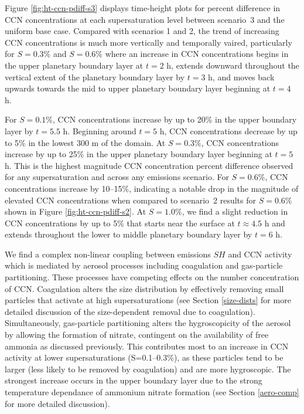 Figure \ref{fig:ht-ccn-pdiff-s3} displays time-height plots for percent difference in CCN concentrations at each supersaturation level between scenario~3 and the uniform base case. 
Compared with scenarios 1 and 2, the trend of increasing CCN concentrations is much more vertically and temporally vaired, particularly for $S=0.3\%$ and $S=0.6\%$ where an increase in CCN concentrations begins in the upper planetary boundary layer at $t=2$ h, extends downward throughout the vertical extent of the planetary boundary layer by $t=3$ h, and moves back upwards towards the mid to upper planetary boundary layer beginning at $t=4$ h. 

For $S=0.1\%$, CCN concentrations increase by up to 20\% in the upper boundary layer by $t=5.5$ h. Beginning around $t=5$ h, CCN concentrations decrease by up to 5\% in the lowest 300 m of the domain. At $S=0.3\%$, CCN concentrations increase by up to 25\% in the upper planetary boundary layer beginning at $t=5$ h. This is the highest magnitude CCN concentration percent difference observed for any supersaturation and across any emissions scenario. For $S=0.6\%$, CCN concentrations increase by 10--15\%, indicating a notable drop in the magnitude of elevated CCN concentrations when compared to scenario~2 results for $S=0.6\%$ shown in Figure \ref{fig:ht-ccn-pdiff-s2}. At $S=1.0\%$, we find a slight reduction in CCN concentrations by up to 5\% that starts near the surface at $t\approx4.5$ h and extends throughout the lower to middle planetary boundary layer by $t=6$ h. 

We find a complex non-linear coupling between emissions $SH$ and CCN activity which is mediated by aerosol processes including coagulation and gas-particle partitioning. These processes have competing effects on the number concentration of CCN. Coagulation alters the size distribution by effectively removing small particles that activate at high supersaturations (see Section \ref{size-dists} for more detailed discussion of the size-dependent removal due to coagulation). Simultaneously, gas-particle partitioning alters the hygroscopicity of the aerosol by allowing the formation of nitrate, contingent on the availability of free ammonia as discussed previously. This contributes most to an increase in CCN activity at lower supersaturations (S=0.1--0.3\%), as these particles tend to be larger (less likely to be removed by coagulation) and are more hygroscopic. The strongest increase occurs in the upper boundary layer due to the strong temperature dependance of ammonium nitrate formation (see Section \ref{aero-comp} for more detailed discussion). 

